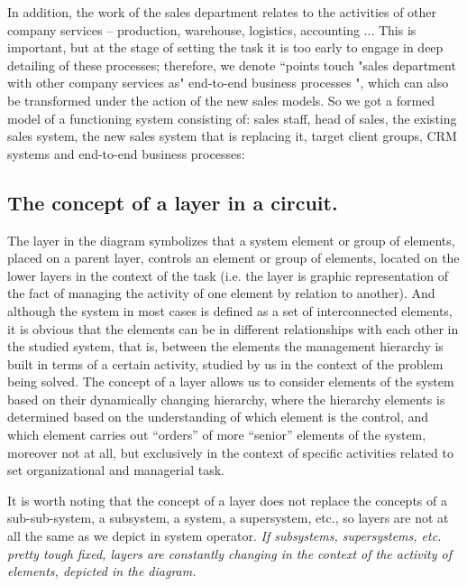 In addition, the work of the sales department relates to the activities of
other company services -- production, warehouse, logistics, accounting
... This is important, but at the stage of setting the task it is too early to
engage in deep detailing of these processes; therefore, we denote “points
touch "sales department with other company services as" end-to-end business
processes ", which can also be transformed under the action of the new sales
models. So we got a formed model of a functioning system consisting of: sales
staff, head of sales, the existing sales system, the new sales system that is
replacing it, target client groups, CRM systems and end-to-end business
processes:


\subsection*{The concept of a layer in a circuit.}

The layer in the diagram symbolizes that a system element or group of
elements, placed on a parent layer, controls an element or group of elements,
located on the lower layers in the context of the task (i.e. the layer is
graphic representation of the fact of managing the activity of one element by
relation to another). And although the system in most cases is defined as a
set of interconnected elements, it is obvious that the elements can be in
different relationships with each other in the studied system, that is,
between the elements the management hierarchy is built in terms of a certain
activity, studied by us in the context of the problem being solved. The
concept of a layer allows us to consider elements of the system based on their
dynamically changing hierarchy, where the hierarchy elements is determined
based on the understanding of which element is the control, and which element
carries out “orders” of more “senior” elements of the system, moreover not at
all, but exclusively in the context of specific activities related to set
organizational and managerial task.

It is worth noting that the concept of a layer does not replace the concepts
of a sub-sub-system, a subsystem, a system, a supersystem, etc., so layers are
not at all the same as we depict in system operator. \emph{If subsystems,
  supersystems, etc. pretty tough fixed, layers are constantly changing in the
  context of the activity of elements, depicted in the diagram.}

